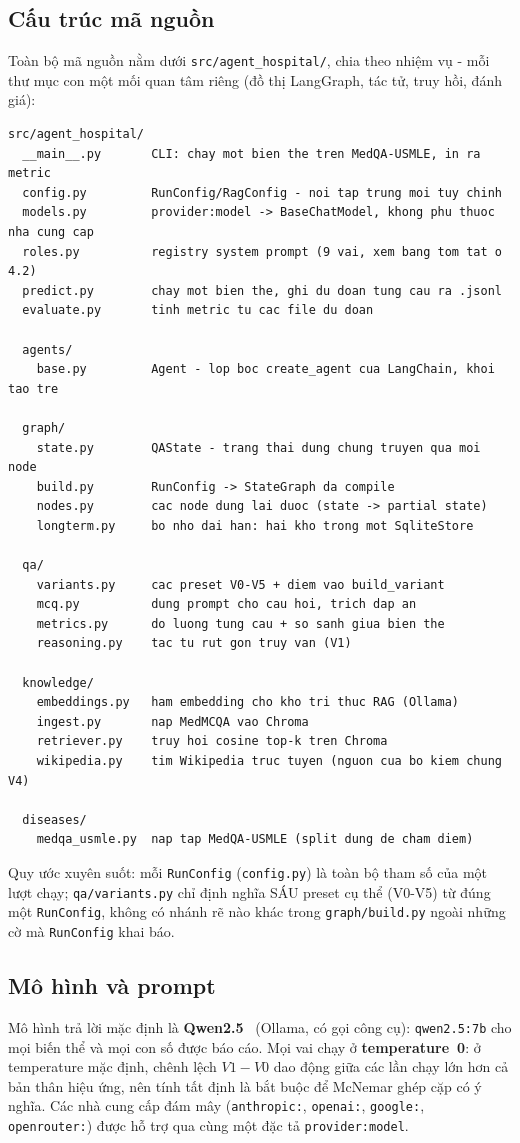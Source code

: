 \documentclass[11pt]{article}
\begin{document}
\subsection{Cấu trúc mã nguồn}
\label{sec:reposcructure}
Toàn bộ mã nguồn nằm dưới \texttt{src/agent\_hospital/}, chia theo nhiệm vụ - mỗi thư mục con một mối
quan tâm riêng (đồ thị LangGraph, tác tử, truy hồi, đánh giá):

\begin{lstlisting}
src/agent_hospital/
  __main__.py       CLI: chay mot bien the tren MedQA-USMLE, in ra metric
  config.py         RunConfig/RagConfig - noi tap trung moi tuy chinh
  models.py         provider:model -> BaseChatModel, khong phu thuoc nha cung cap
  roles.py          registry system prompt (9 vai, xem bang tom tat o 4.2)
  predict.py        chay mot bien the, ghi du doan tung cau ra .jsonl
  evaluate.py       tinh metric tu cac file du doan

  agents/
    base.py         Agent - lop boc create_agent cua LangChain, khoi tao tre

  graph/
    state.py        QAState - trang thai dung chung truyen qua moi node
    build.py        RunConfig -> StateGraph da compile
    nodes.py        cac node dung lai duoc (state -> partial state)
    longterm.py     bo nho dai han: hai kho trong mot SqliteStore

  qa/
    variants.py     cac preset V0-V5 + diem vao build_variant
    mcq.py          dung prompt cho cau hoi, trich dap an
    metrics.py      do luong tung cau + so sanh giua bien the
    reasoning.py    tac tu rut gon truy van (V1)

  knowledge/
    embeddings.py   ham embedding cho kho tri thuc RAG (Ollama)
    ingest.py       nap MedMCQA vao Chroma
    retriever.py    truy hoi cosine top-k tren Chroma
    wikipedia.py    tim Wikipedia truc tuyen (nguon cua bo kiem chung V4)

  diseases/
    medqa_usmle.py  nap tap MedQA-USMLE (split dung de cham diem)
\end{lstlisting}

Quy ước xuyên suốt: mỗi \texttt{RunConfig} (\texttt{config.py}) là toàn bộ tham số của một lượt chạy;
\texttt{qa/variants.py} chỉ định nghĩa SÁU preset cụ thể (V0-V5) từ đúng một \texttt{RunConfig}, không
có nhánh rẽ nào khác trong \texttt{graph/build.py} ngoài những cờ mà \texttt{RunConfig} khai báo.

\subsection{Mô hình và prompt}
Mô hình trả lời mặc định là \textbf{Qwen2.5}~\cite{qwen2025} (Ollama, có gọi công cụ): \texttt{qwen2.5:7b}
cho mọi biến thể và mọi con số được báo cáo. Mọi vai chạy ở \textbf{temperature~0}: ở temperature mặc định, chênh
lệch $V1-V0$ dao động giữa các lần chạy lớn hơn cả bản thân hiệu ứng, nên tính tất định là bắt buộc để
McNemar ghép cặp có ý nghĩa. Các nhà cung cấp đám mây (\texttt{anthropic:}, \texttt{openai:},
\texttt{google:}, \texttt{openrouter:}) được hỗ trợ qua cùng một đặc tả \texttt{provider:model}.
\end{document}
